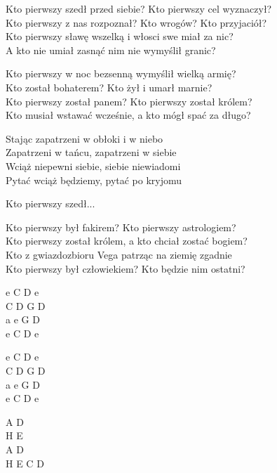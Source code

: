 \begin{text}
    \begin{footTwo}
    Kto pierwszy szedł przed siebie? Kto pierwszy cel wyznaczył?\\
    Kto pierwszy z nas rozpoznał? Kto wrogów? Kto przyjaciół?\\
    Kto pierwszy sławę wszelką i włosci swe miał za nic?\\
    A kto nie umiał zasnąć nim nie wymyślił granic?

    Kto pierwszy w noc bezsenną wymyślił wielką armię?\\
    Kto został bohaterem? Kto żył i umarł marnie?\\
    Kto pierwszy został panem? Kto pierwszy został królem?\\
    Kto musiał wstawać wcześnie, a kto mógł spać za długo?

    Stając zapatrzeni w obłoki i w niebo\\
    Zapatrzeni w tańcu, zapatrzeni w siebie\\
    Wciąż niepewni siebie, siebie niewiadomi\\
    Pytać wciąż będziemy, pytać po kryjomu

    Kto pierwszy szedł...

    Kto pierwszy był fakirem? Kto pierwszy astrologiem?\\
    Kto pierwszy został królem, a kto chciał zostać bogiem?\\
    Kto z gwiazdozbioru Vega patrząc na ziemię zgadnie\\
    Kto pierwszy był człowiekiem? Kto będzie nim ostatni?
\end{footTwo}
\end{text}
\begin{chord}
    \begin{footTwo}
    e C D e\\
    C D G D\\
    a e G D\\
    e C D e

    e C D e\\
    C D G D\\
    a e G D\\
    e C D e

    A D\\
    H E\\
    A D\\
    H E C D
\end{footTwo}
\end{chord}